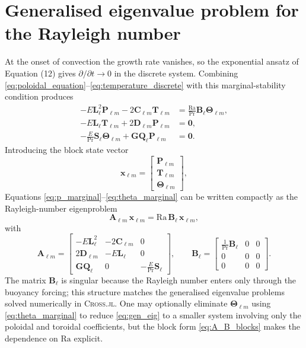 \documentclass[11pt]{article}
\numberwithin{equation}{section}
\begin{document}
\section{Generalised eigenvalue problem for the Rayleigh number}
At the onset of convection the growth rate vanishes, so the exponential ansatz of Equation (12) gives $\partial/\partial t \to 0$ in the discrete system. Combining \eqref{eq:poloidal_equation}--\eqref{eq:temperature_discrete} with this marginal-stability condition produces
\begin{align}
  -E \bm{L}_\ell^2 \bm{P}_{\ell m} - 2 \bm{C}_{\ell m} \bm{T}_{\ell m}
    &= \frac{\mathrm{Ra}}{\mathrm{Pr}} \bm{B}_\ell \bm{\Theta}_{\ell m}, \label{eq:p_marginal} \\
  -E \bm{L}_\ell \bm{T}_{\ell m} + 2 \bm{D}_{\ell m} \bm{P}_{\ell m}
    &= \bm{0}, \label{eq:t_marginal} \\
  -\frac{E}{\mathrm{Pr}} \bm{S}_\ell \bm{\Theta}_{\ell m} + \bm{G} \bm{Q}_\ell \bm{P}_{\ell m}
    &= \bm{0}. \label{eq:theta_marginal}
\end{align}
Introducing the block state vector
\begin{equation}
  \bm{x}_{\ell m} =
  \begin{bmatrix}
    \bm{P}_{\ell m} \\
    \bm{T}_{\ell m} \\
    \bm{\Theta}_{\ell m}
  \end{bmatrix},
\end{equation}
Equations \eqref{eq:p_marginal}--\eqref{eq:theta_marginal} can be written compactly as the Rayleigh-number eigenproblem
\begin{equation}
  \bm{A}_{\ell m} \, \bm{x}_{\ell m} = \mathrm{Ra} \, \bm{B}_{\ell} \, \bm{x}_{\ell m},
  \label{eq:gen_eig}
\end{equation}
with
\begin{equation}
  \bm{A}_{\ell m} =
  \begin{bmatrix}
    -E \bm{L}_\ell^2 & -2 \bm{C}_{\ell m} & 0 \\
    2 \bm{D}_{\ell m} & -E \bm{L}_\ell    & 0 \\
    \bm{G} \bm{Q}_\ell & 0 & -\frac{E}{\mathrm{Pr}} \bm{S}_\ell
  \end{bmatrix},
  \qquad
  \bm{B}_{\ell} =
  \begin{bmatrix}
    \frac{1}{\mathrm{Pr}} \bm{B}_\ell & 0 & 0 \\
    0 & 0 & 0 \\
    0 & 0 & 0
  \end{bmatrix}.
  \label{eq:A_B_blocks}
\end{equation}
The matrix $\bm{B}_\ell$ is singular because the Rayleigh number enters only through the buoyancy forcing; this structure matches the generalised eigenvalue problems solved numerically in \textsc{Cross.jl}. One may optionally eliminate $\bm{\Theta}_{\ell m}$ using \eqref{eq:theta_marginal} to reduce \eqref{eq:gen_eig} to a smaller system involving only the poloidal and toroidal coefficients, but the block form \eqref{eq:A_B_blocks} makes the dependence on $\mathrm{Ra}$ explicit.
\end{document}
